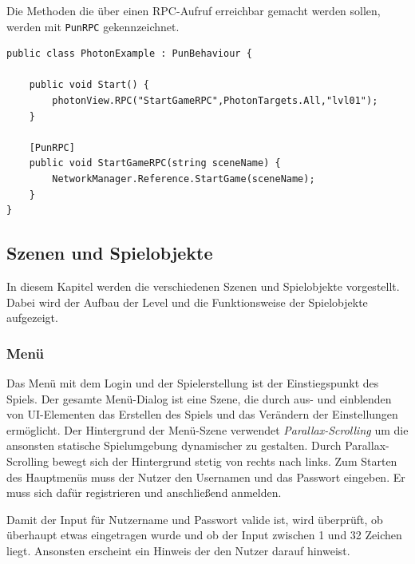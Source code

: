 Die Methoden die über einen RPC-Aufruf erreichbar gemacht werden sollen, werden mit \texttt{PunRPC} gekennzeichnet.

\begin{lstlisting}[caption={RPC-Aufrufe}, label=lst:implementierung:umsetzung:codebeispiele1]
public class PhotonExample : PunBehaviour {

    public void Start() {        
        photonView.RPC("StartGameRPC",PhotonTargets.All,"lvl01");    
    }
    
    [PunRPC]    
    public void StartGameRPC(string sceneName) {        
        NetworkManager.Reference.StartGame(sceneName);    
    }
}
\end{lstlisting}

\subsection{Szenen und Spielobjekte}
\label{subsec:implementierung:umsetzung:realisierung}
In diesem Kapitel werden die verschiedenen Szenen und Spielobjekte vorgestellt. Dabei wird der Aufbau der Level und die Funktionsweise der Spielobjekte aufgezeigt.

\subsubsection{Menü}
\label{subsubsec:implementierung:umsetzung:realisierung:menu}

Das Menü mit dem Login und der Spielerstellung ist der Einstiegspunkt des Spiels. Der gesamte Menü-Dialog ist eine Szene, die durch aus- und einblenden von UI-Elementen das Erstellen des Spiels und das Verändern der Einstellungen ermöglicht. Der Hintergrund der Menü-Szene verwendet \textit{Parallax-Scrolling} um die ansonsten statische Spielumgebung dynamischer zu gestalten. Durch Parallax-Scrolling bewegt sich der Hintergrund stetig von rechts nach links. Zum Starten des Hauptmenüs muss der Nutzer den Usernamen und das Passwort eingeben. Er muss sich dafür registrieren und anschließend anmelden. 

Damit der Input für Nutzername und Passwort valide ist, wird überprüft, ob überhaupt etwas eingetragen wurde und ob der Input zwischen 1 und 32 Zeichen liegt. Ansonsten erscheint ein Hinweis der den Nutzer darauf hinweist.

